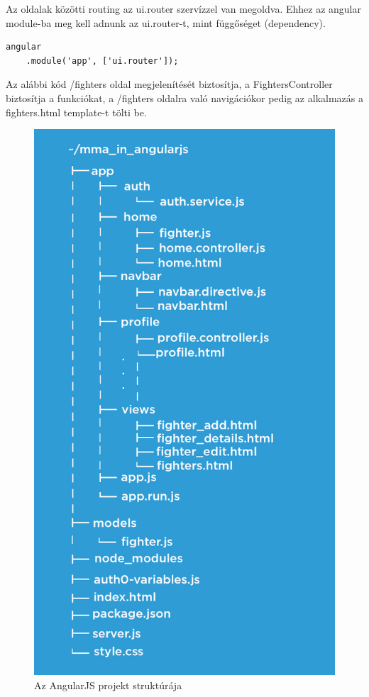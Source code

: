 
Az oldalak közötti routing az ui.router szervízzel van megoldva.
Ehhez az angular module-ba meg kell adnunk az ui.router-t, mint függőséget (dependency).

\begin{verbatim}
angular
    .module('app', ['ui.router']);
\end{verbatim}

Az alábbi kód /fighters oldal megjelenítését biztosítja, a FightersController biztosítja a funkciókat, a /fighters oldalra való navigációkor pedig az alkalmazás a fighters.html template-t tölti be.



\begin{figure}[htb]
\centering
\includegraphics[scale=0.4]{kepek/mma_in_angularjs.jpeg}
\caption{Az AngularJS projekt struktúrája}
\label{fig:angularjs_structure}
\end{figure}
